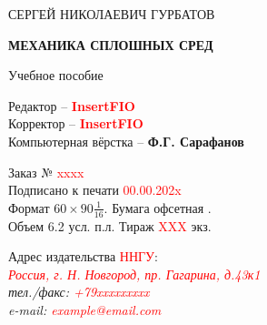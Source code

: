 \begin{titlepage}
	

\thispagestyle{empty}
\begin{center}
{\large
\bigskip
СЕРГЕЙ НИКОЛАЕВИЧ ГУРБАТОВ \\


\vskip 30pt

{\bf МЕХАНИКА СПЛОШНЫХ СРЕД}

\vskip 30pt

Учебное пособие
}
\vskip 30pt
{\large
Редактор -- {\bf \textcolor{red}{InsertFIO} }\\
Корректор -- {\bf \textcolor{red}{InsertFIO} }\\
Компьютерная вёрстка -- {\bf Ф.Г. Сарафанов }\\
}
\bigskip
\bigskip
\bigskip

\linespread{1.0}\normalsize




\bigskip
\vfill
{\normalsize Заказ  № \textcolor{red}{xxxx} \\
Подписано к печати \textcolor{red}{00.00.202x} \\
Формат $ 60 \times 90 {\frac 1 {16}} $. Бумага офсетная .\\
Объем 6.2 усл. п.л. Тираж \textcolor{red}{XXX} экз. }

\bigskip

{\normalsize
Адрес издательства \textcolor{red}{ННГУ}: \\
{\em   \textcolor{red}{Россия, г. Н. Новгород, пр. Гагарина, д.43к1} \\
тел./факс: \textcolor{red}{+79xxxxxxxxx} \\
e-mail: \textcolor{red}{example@email.com} } }
\end{center}
\end{titlepage}

